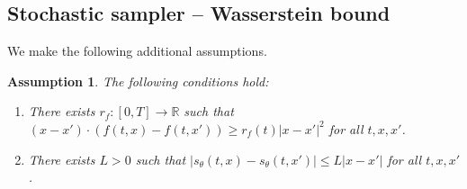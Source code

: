 \documentclass[letterpaper,11pt,reqno]{amsart}
\newtheorem{assump}[theorem]{Assumption}
\numberwithin{equation}{section}
\begin{document}
\subsection{Stochastic sampler -- Wasserstein bound}
\label{sc412}

We make the following additional assumptions.
\begin{assump}
\label{assump:sensitivity}
The following conditions hold:
\begin{enumerate}[itemsep = 3 pt]
\item
There exists $r_f: [0,T] \to \mathbb{R}$ such that 
$(x - x') \cdot (f(t,x) - f(t,x')) \ge r_f(t) |x - x'|^2$ for all $t,x,x'$.
\item
There exists $L > 0$ such that $|s_\theta (t,x) - s_\theta (t,x')| \le L |x-x'|$ for all $t,x,x'$.
\end{enumerate}
\end{assump}
\end{document}
